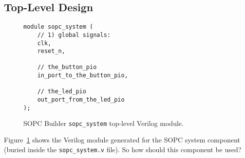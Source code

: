 \documentclass[10pt,twoside]{article}
\begin{document}
\subsection{Top-Level Design}
\label{sec:sopc_system_top_level}

\lstset{language=Verilog}
\begin{figure}
\begin{center}
\begin{minipage}{0.6\textwidth}
\begin{lstlisting}
module sopc_system (
    // 1) global signals:
    clk,
    reset_n,

    // the_button_pio
    in_port_to_the_button_pio,

    // the_led_pio
    out_port_from_the_led_pio
);
\end{lstlisting}
\end{minipage}
\end{center}
\caption{SOPC Builder {\tt sopc\_system} top-level Verilog module.}
\label{fig:sopc_system_verilog}
\end{figure}
%

Figure~\ref{fig:sopc_system_verilog} shows the Verilog module 
generated for the SOPC system component (buried inside the
\verb+sopc_system.v+ file). So how should this component be used?
\end{document}
